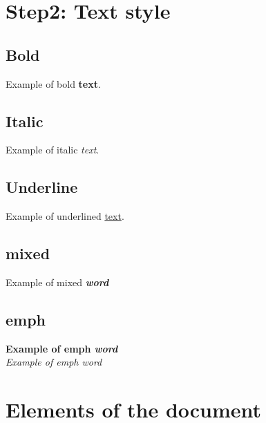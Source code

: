 \documentclass[a4paper, oneside]{book}
\begin{document}


\tableofcontents
\listoffigures
\listoftables
\printglossary
\clearpage

\setcounter{page}{1}
 





 
\chapter{Step2: Text style}
\section{Bold}
Example of bold \textbf{text}.
\section{Italic}
Example of italic \textit{text}.
\section{Underline}
Example of underlined \underline{text}.
\section{mixed}
Example of mixed \textbf{\textit{word}}
\section{emph}
\textbf{Example of emph \emph{word}}\\
\textit{Example of emph \emph{word}}

\chapter{Elements of the document}
\end{document}
